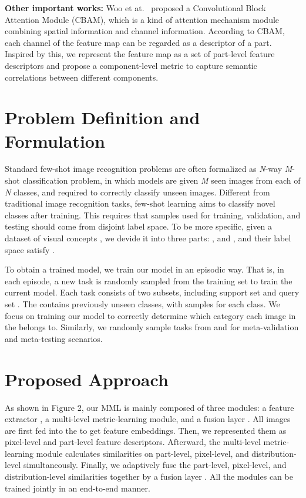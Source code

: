 \documentclass[10pt,twocolumn,letterpaper]{article}
\begin{document}
\textbf{Other important works:}
Woo et at.~\cite{eccvWooPLK18} proposed a Convolutional Block Attention Module (CBAM), which is a kind of attention mechanism module combining spatial information and channel information. According to CBAM, each channel of the feature map can be regarded as a descriptor of a part. Inspired by this, we represent the feature map as a set of part-level feature descriptors and propose a component-level metric to capture semantic correlations between different components.


\section{Problem Definition and Formulation}
Standard few-shot image recognition problems are often formalized as \emph{N}-way \emph{M}-shot classification problem, in which models are given \emph{M} seen images from each of \emph{N} classes, and required to correctly classify unseen images. 
Different from traditional image recognition tasks, few-shot learning aims to classify novel classes after training. This requires
that samples used for training, validation, and testing should
come from disjoint label space.
To be more specific, given a dataset of visual concepts , we devide it into three parts: ,  and , and their label space satisfy .

To obtain a trained model, we train our model in an episodic way. That is, in each episode, a new task is randomly sampled from the training set  to train the current model. Each task consists of two subsets, including support set  and query set . The  contains  previously unseen classes, with  samples for each class. We focus on training our model to correctly determine which category each image in the  belongs to. Similarly, we randomly sample tasks from  and  for meta-validation and meta-testing scenarios.

\section{Proposed Approach}
As shown in Figure 2, our MML is mainly composed of three modules: a feature extractor , a multi-level metric-learning module, and a fusion layer . All images are first fed into the  to get feature embeddings. Then, we represented them as pixel-level and part-level feature descriptors. Afterward, the multi-level metric-learning module calculates similarities on part-level, pixel-level, and distribution-level simultaneously. Finally, we adaptively fuse the part-level, pixel-level, and distribution-level similarities together by a fusion layer . All the modules can be trained jointly in an end-to-end manner.
\end{document}
